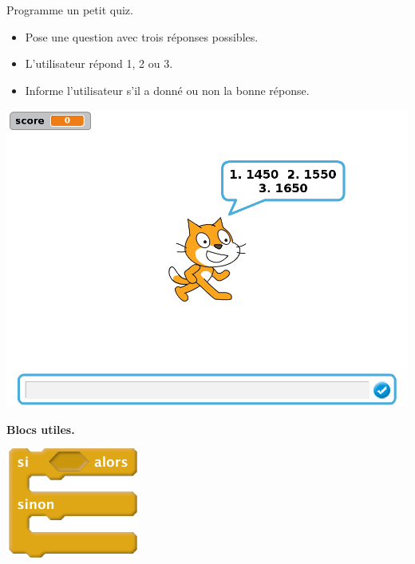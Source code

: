 \documentclass[class=report,crop=false, 12pt]{standalone}
\begin{document}




\bigskip
\bigskip

\begin{activite}

Programme un petit quiz.

\begin{itemize}
  \item Pose une question avec trois réponses possibles. 
  \item L'utilisateur répond 1, 2 ou 3.
  \item Informe l'utilisateur s'il a donné ou non la bonne réponse.
\end{itemize}



\begin{center}
  \includegraphics[scale=\scaleecran]{ecran-07-ex1} 
\end{center}


\bigskip

\textbf{Blocs utiles.}

\begin{center}
  \includegraphics[scale=\scalebloc]{bloc-07-ex1} 
\end{center} 
  

\end{activite}
\end{document}

